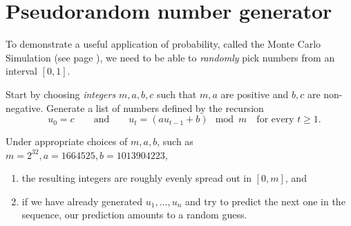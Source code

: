 \documentclass[../main.tex]{subfiles}
\begin{document}
 \section{Pseudorandom number generator}

To demonstrate a useful application of probability, called the Monte Carlo Simulation (see page \pageref{sec:monte-carlo}), we need to be able to \emph{randomly} pick numbers from an interval \([0,1]\).

Start by choosing \emph{integers} \(m,a,b,c\) such that \(m,a\) are positive and \(b,c\) are non-negative. Generate a list of numbers defined by the recursion
\[
  \quad u_{0} = c \qquad\text{and}\qquad u_{t} = (a u_{t-1} + b) \mod m \quad\text{for every \(t \ge 1\)}.
\]

Under appropriate choices of \(m,a,b\), such as \(m = 2^{32}, a = 1664525, b = 1013904223\), 
\begin{enumerate}
  \item the resulting integers are roughly evenly spread out in \([0,m]\), and
  \item if we have already generated \(u_{1},\ldots,u_{n}\) and try to predict the next one in the sequence, our prediction amounts to a random guess.
\end{enumerate}
\end{document}
